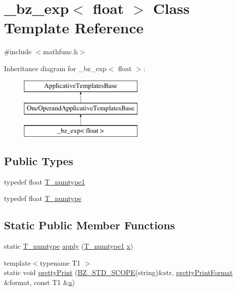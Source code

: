 \hypertarget{class__bz__exp_3_01float_01_4}{}\section{\+\_\+bz\+\_\+exp$<$ float $>$ Class Template Reference}
\label{class__bz__exp_3_01float_01_4}


{\ttfamily \#include $<$mathfunc.\+h$>$}

Inheritance diagram for \+\_\+bz\+\_\+exp$<$ float $>$\+:\begin{figure}[H]
\begin{center}
\leavevmode
\includegraphics[height=3.000000cm]{class__bz__exp_3_01float_01_4}
\end{center}
\end{figure}
\subsection*{Public Types}
\begin{DoxyCompactItemize}
\item 
typedef float \hyperlink{class__bz__exp_3_01float_01_4_a01171131adb08e02ebf8acfa62619bd0}{T\+\_\+numtype1}
\item 
typedef float \hyperlink{class__bz__exp_3_01float_01_4_a3fc6241e657886171b3228e7e94c6752}{T\+\_\+numtype}
\end{DoxyCompactItemize}
\subsection*{Static Public Member Functions}
\begin{DoxyCompactItemize}
\item 
static \hyperlink{class__bz__exp_3_01float_01_4_a3fc6241e657886171b3228e7e94c6752}{T\+\_\+numtype} \hyperlink{class__bz__exp_3_01float_01_4_ae7c721d90513574b8109b3858c4dc408}{apply} (\hyperlink{class__bz__exp_3_01float_01_4_a01171131adb08e02ebf8acfa62619bd0}{T\+\_\+numtype1} \hyperlink{vecnorm1_8cc_ac73eed9e41ec09d58f112f06c2d6cb63}{x})
\item 
{\footnotesize template$<$typename T1 $>$ }\\static void \hyperlink{class__bz__exp_3_01float_01_4_ab9ee431eb5b3487b71235e7915f49f3d}{pretty\+Print} (\hyperlink{numinquire_8h_a2b24ffc3b4ef9803956bc7715c6c7b83}{B\+Z\+\_\+\+S\+T\+D\+\_\+\+S\+C\+O\+P\+E}(string)\&str, \hyperlink{classprettyPrintFormat}{pretty\+Print\+Format} \&format, const T1 \&\hyperlink{gen__mat5files_8m_aae328bf20413f220e38aec4d95bfd6da}{a})
\end{DoxyCompactItemize}


